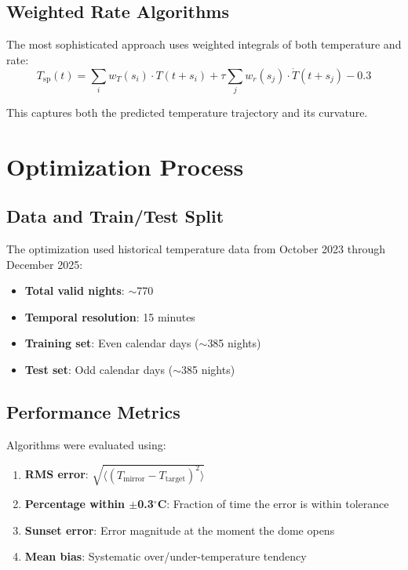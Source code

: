 \documentclass[11pt,letterpaper]{article}
\begin{document}
\subsection{Weighted Rate Algorithms}

The most sophisticated approach uses weighted integrals of both temperature and rate:
\begin{equation}
T_{\text{sp}}(t) = \sum_i w_T(s_i) \cdot T(t+s_i) + \tau \sum_j w_r(s_j) \cdot \dot{T}(t+s_j) - 0.3
\label{eq:weighted_rate}
\end{equation}

This captures both the predicted temperature trajectory and its curvature.

\section{Optimization Process}

\subsection{Data and Train/Test Split}

The optimization used historical temperature data from October 2023 through December 2025:
\begin{itemize}[noitemsep]
    \item \textbf{Total valid nights}: $\sim$770
    \item \textbf{Temporal resolution}: 15 minutes
    \item \textbf{Training set}: Even calendar days ($\sim$385 nights)
    \item \textbf{Test set}: Odd calendar days ($\sim$385 nights)
\end{itemize}

\subsection{Performance Metrics}

Algorithms were evaluated using:
\begin{enumerate}[noitemsep]
    \item \textbf{RMS error}: $\sqrt{\langle(T_{\text{mirror}} - T_{\text{target}})^2\rangle}$
    \item \textbf{Percentage within $\pm$0.3$^\circ$C}: Fraction of time the error is within tolerance
    \item \textbf{Sunset error}: Error magnitude at the moment the dome opens
    \item \textbf{Mean bias}: Systematic over/under-temperature tendency
\end{enumerate}
\end{document}
